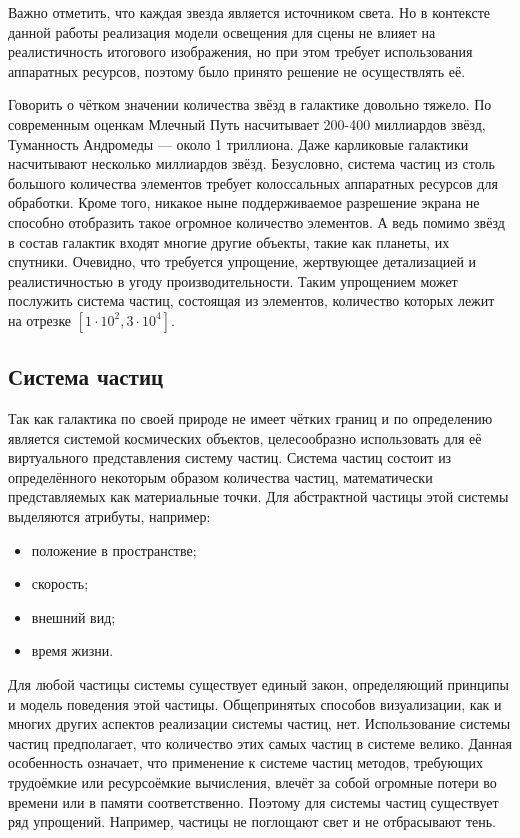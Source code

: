 Важно отметить, что каждая звезда является источником света. Но в контексте данной работы реализация модели освещения для сцены не влияет на реалистичность итогового изображения, но при этом требует использования аппаратных ресурсов, поэтому было принято решение не осуществлять её.

Говорить о чётком значении количества звёзд в галактике довольно тяжело. По современным оценкам Млечный Путь насчитывает 200-400 миллиардов звёзд, Туманность Андромеды — около 1 триллиона. Даже карликовые галактики насчитывают несколько миллиардов звёзд. Безусловно, система частиц из столь большого количества элементов требует колоссальных аппаратных ресурсов для обработки. Кроме того, никакое ныне поддерживаемое разрешение экрана не способно отобразить такое огромное количество элементов. А ведь помимо звёзд в состав галактик входят многие другие объекты, такие как планеты, их спутники. Очевидно, что требуется упрощение, жертвующее детализацией и реалистичностью в угоду производительности. Таким упрощением может послужить система частиц, состоящая из элементов, количество которых лежит на отрезке $[1\cdot{}10^2, 3\cdot{}10^4]$.

\subsection{Система частиц}

Так как галактика по своей природе не имеет чётких границ и по определению является системой космических объектов, целесообразно использовать для её виртуального представления систему частиц. Система частиц состоит из определённого некоторым образом количества частиц, математически представляемых как материальные точки. Для абстрактной частицы этой системы выделяются атрибуты, например:
\begin{itemize}
	\item положение в пространстве;
	\item скорость;
	\item внешний вид;
	\item время жизни.
\end{itemize}

Для любой частицы системы существует единый закон, определяющий принципы и модель поведения этой частицы. Общепринятых способов визуализации, как и многих других аспектов реализации системы частиц, нет. Использование системы частиц предполагает, что количество этих самых частиц в системе велико. Данная особенность означает, что применение к системе частиц методов, требующих трудоёмкие или ресурсоёмкие вычисления, влечёт за собой огромные потери во времени или в памяти соответственно. Поэтому для системы частиц существует ряд упрощений. Например, частицы не поглощают свет и не отбрасывают тень.

